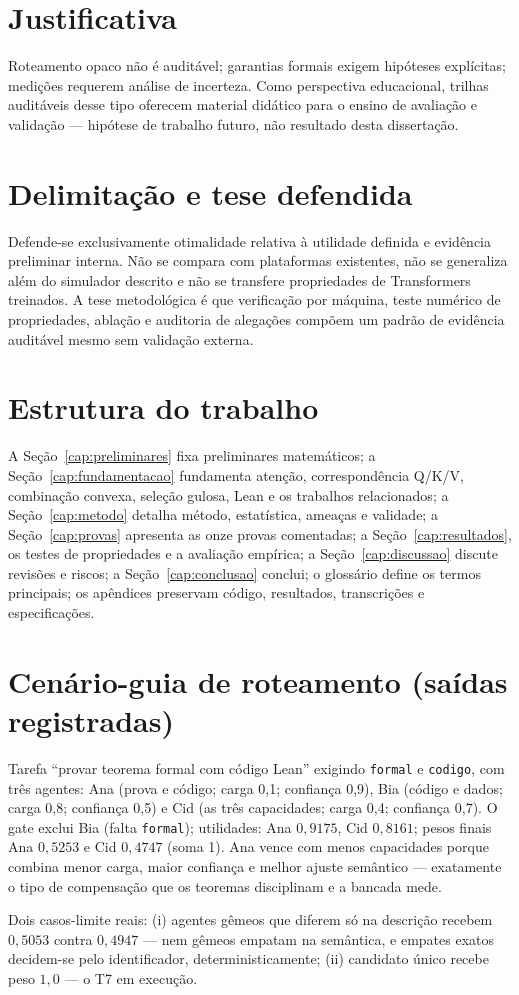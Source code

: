 \documentclass[12pt,openany,oneside,a4paper,brazil,chapter=TITLE]{abntex2}
\begin{document}
\section{Justificativa}
Roteamento opaco não é auditável; garantias formais exigem hipóteses explícitas; medições requerem análise de incerteza. Como perspectiva educacional, trilhas auditáveis desse tipo oferecem material didático para o ensino de avaliação e validação --- hipótese de trabalho futuro, não resultado desta dissertação.
\section{Delimitação e tese defendida}
Defende-se exclusivamente otimalidade relativa à utilidade definida e evidência preliminar interna. Não se compara com plataformas existentes, não se generaliza além do simulador descrito e não se transfere propriedades de Transformers treinados. A tese metodológica é que verificação por máquina, teste numérico de propriedades, ablação e auditoria de alegações compõem um padrão de evidência auditável mesmo sem validação externa.
\section{Estrutura do trabalho}
A Seção~\ref{cap:preliminares} fixa preliminares matemáticos; a Seção~\ref{cap:fundamentacao} fundamenta atenção, correspondência Q/K/V, combinação convexa, seleção gulosa, Lean e os trabalhos relacionados; a Seção~\ref{cap:metodo} detalha método, estatística, ameaças e validade; a Seção~\ref{cap:provas} apresenta as onze provas comentadas; a Seção~\ref{cap:resultados}, os testes de propriedades e a avaliação empírica; a Seção~\ref{cap:discussao} discute revisões e riscos; a Seção~\ref{cap:conclusao} conclui; o glossário define os termos principais; os apêndices preservam código, resultados, transcrições e especificações.
\section{Cenário-guia de roteamento (saídas registradas)}
Tarefa ``provar teorema formal com código Lean'' exigindo \texttt{formal} e \texttt{codigo}, com três agentes: Ana (prova e código; carga 0,1; confiança 0,9), Bia (código e dados; carga 0,8; confiança 0,5) e Cid (as três capacidades; carga 0,4; confiança 0,7). O gate exclui Bia (falta \texttt{formal}); utilidades: Ana $0{,}9175$, Cid $0{,}8161$; pesos finais Ana $0{,}5253$ e Cid $0{,}4747$ (soma 1). Ana vence com menos capacidades porque combina menor carga, maior confiança e melhor ajuste semântico --- exatamente o tipo de compensação que os teoremas disciplinam e a bancada mede.
\par Dois casos-limite reais: (i) agentes gêmeos que diferem só na descrição recebem $0{,}5053$ contra $0{,}4947$ --- nem gêmeos empatam na semântica, e empates exatos decidem-se pelo identificador, deterministicamente; (ii) candidato único recebe peso $1{,}0$ --- o T7 em execução.
\end{document}
